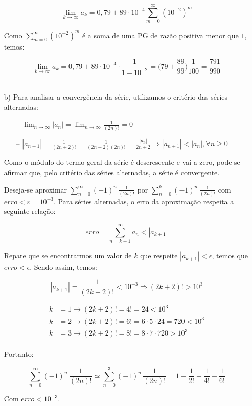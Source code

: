 \documentclass[12pt,a4paper]{article}
\begin{document}
\begin{itemize}
    $$ \lim_{k \rightarrow \infty} a_k = 0,79 + 89 \cdot 10^{-4} \sum_{m=0}^{\infty} (10^{-2})^m $$
    
    Como $\displaystyle\sum_{m=0}^{\infty} (10^{-2})^m$ é a soma de uma PG de razão positiva menor que $1$, temos:
    
    $$ \lim_{k \rightarrow \infty} a_k = 0,79 + 89 \cdot 10^{-4} \cdot \frac{1}{1 - 10^{-2}} = \Big(79 + \frac{89}{99} \Big) \frac{1}{100} = \frac{791}{990} $$ \\



    \item[b)] Para analisar a convergência da série, utilizamos o critério das séries alternadas:
    
    \begin{itemize}
    \item[--] $\displaystyle\lim_{n \rightarrow \infty} |a_n| = \lim_{n \rightarrow \infty} \displaystyle\frac{1}{(2n)!} = 0 $
    \item[--] $|a_{n+1}| = \displaystyle\frac{1}{(2n+2)!} = \displaystyle\frac{1}{(2n+2)(2n)!} = \frac{|a_n|}{2n+2} \Rightarrow |a_{n+1}| < |a_n|, \forall n \geq 0  $
    \end{itemize}
    
    Como o módulo do termo geral da série é descrescente e vai a zero, pode-se afirmar que, pelo critério das séries alternadas, a série é convergente.
    
    Deseja-se aproximar $\displaystyle\sum_{n=0}^\infty (-1)^n \, \frac{1}{(2n)!}$ por $\displaystyle\sum_{n=0}^k (-1)^n \, \frac{1}{(2n)!}$  com $erro < \varepsilon = 10^{-3}$.
Para séries alternadas, o erro da aproximação respeita a seguinte relação:

$$ erro = \sum_{n=k+1}^\infty a_n < |a_{k+1}| $$

Repare que se encontrarmos um valor de $k$ que respeite $|a_{k+1}| < \epsilon$, temos que $erro < \epsilon$. Sendo assim, temos:

$$|a_{k+1}| = \frac{1}{(2k+2)!} < 10^{-3} \Rightarrow (2k+2)! > 10^{3} $$

\begin{align*} 
    k &= 1 \rightarrow (2k+2)! = 4! = 24 < 10^3 \\ 
    k &= 2 \rightarrow (2k+2)! = 6! = 6 \cdot 5 \cdot 24 = 720 < 10^3 \\ 
    k &= 3 \rightarrow (2k+2)! = 8! = 8 \cdot 7 \cdot 720  > 10^3 \\ 
\end{align*}

Portanto: 

$$ \sum_{n=0}^\infty (-1)^n \, \frac{1}{(2n)!}  \simeq \sum_{n=0}^3 (-1)^n \, \frac{1}{(2n)!} = 1 - \frac{1}{2!} + \frac{1}{4!} - \frac{1}{6!}  $$

Com $erro < 10^{-3}$.
    

\end{itemize}
\ \
\end{document}
